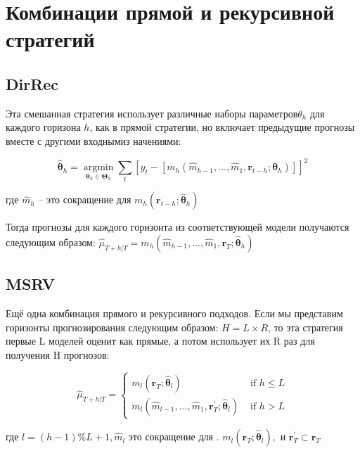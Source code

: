 \documentclass[a4paper,12pt]{article}
\begin{document}
\section{Комбинации прямой и рекурсивной стратегий}

\subsection{DirRec}

Эта смешанная стратегия использует различные наборы параметров$ \theta_{h} $ для каждого горизона $ h $, как в прямой стратегии, но включает предыдущие прогнозы вместе с другими входнымиз начениями:

\[
\hat{\boldsymbol{\theta}}_{h}=\underset{\boldsymbol{\theta}_{h} \in \boldsymbol{\Theta}_{h}}{\operatorname{argmin}} \sum_{t}\left[y_{t}-\left[m_{h}\left(\hat{m}_{h-1}, \ldots, \hat{m}_{1}, \boldsymbol{r}_{t-h} ; \boldsymbol{\theta}_{h}\right)\right]\right]^{2}
\]

где $\hat{m}_{h}$ -- это сокращение для  $m_{h}\left(\boldsymbol{r}_{t-h} ; \hat{\boldsymbol{\theta}}_{h}\right)$ 

Тогда прогнозы для каждого горизонта из соответствующей модели получаются следующим образом: $\hat{\mu}_{T+h | T}=m_{h}\left(\hat{m}_{h-1}, \ldots, \hat{m}_{1}, \boldsymbol{r}_{T} ; \hat{\boldsymbol{\theta}}_{h}\right)$

\subsection{MSRV}

Ещё одна комбинация прямого и рекурсивного подходов. Если мы представим горизонты прогнозирования следующим образом: $H=L \times R$, то эта стратегия первые L моделей оценит как прямые, а потом использует их R раз для получения H прогнозов:

\[
\hat{\mu}_{T+h | T}=\left\{\begin{array}{ll}{m_{l}\left(\boldsymbol{r}_{T} ; \hat{\boldsymbol{\theta}}_{l}\right)} & {\text { if } h \leq L} \\ {m_{l}\left(\hat{m}_{l-1}, \ldots, \hat{m}_{1}, \boldsymbol{r}_{T}^{\prime} ; \hat{\boldsymbol{\theta}}_{l}\right)} & {\text { if } h>L}\end{array}\right.
\]

где $l=\left(h-1 \right) \% L+1, \hat{m}_{l} \text { это сокращение для }.$
$m_{l}\left(\boldsymbol{r}_{T} ; \hat{\boldsymbol{\theta}}_{l}\right),$ и $\boldsymbol{r}_{T}^{\prime} \subset \boldsymbol{r}_{T}$
\end{document}
